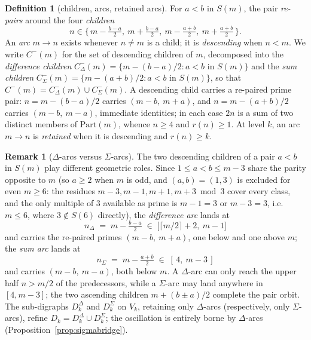 \documentclass[11pt]{article}
\theoremstyle{plain}
\theoremstyle{definition}
\newtheorem{definition}[theorem]{Definition}
\newtheorem{remark}[theorem]{Remark}
\newcommand{\rays}{S}
\newcommand{\rch}{r}
\newcommand{\Vk}{V_{k}}
\newcommand{\Dk}{D_{k}}
\newcommand{\DkD}{D_{k}^{\Delta}}
\newcommand{\DkS}{D_{k}^{\Sigma}}
\begin{document}
\begin{definition}[children, arcs, retained arcs]\label{def:children}
For $a < b$ in $\rays(m)$, the pair \emph{re-pairs} around the four
\emph{children}
\[
n \in \bigl\{\, m - \tfrac{b-a}{2},\ m + \tfrac{b-a}{2},\
                 m - \tfrac{a+b}{2},\ m + \tfrac{a+b}{2}\,\bigr\}.
\]
An \emph{arc} $m \to n$ exists whenever $n \neq m$ is a child; it is
\emph{descending} when $n < m$. We write $C^{-}(m)$ for the set of
descending children of $m$, decomposed into the \emph{difference
children} $C_\Delta^{-}(m) = \{m - (b-a)/2 : a < b \text{ in }
\rays(m)\}$ and the \emph{sum children}
$C_\Sigma^{-}(m) = \{m - (a+b)/2 : a < b \text{ in } \rays(m)\}$, so
that $C^{-}(m) = C_\Delta^{-}(m) \cup C_\Sigma^{-}(m)$. A descending
child carries a re-paired prime pair: $n = m - (b-a)/2$ carries
$(m-b,\ m+a)$, and $n = m - (a+b)/2$ carries $(m-b,\ m-a)$, immediate
identities; in each case $2n$ is a sum of two distinct members of
$\mathrm{Part}(m)$, whence $n \ge 4$ and $\rch(n) \ge 1$. At level
$k$, an arc $m \to n$ is \emph{retained} when it is descending and
$\rch(n) \ge k$.
\end{definition}

\begin{remark}[$\Delta$-arcs versus $\Sigma$-arcs]\label{rem:dsarc}
The two descending children of a pair $a < b$ in $\rays(m)$ play
different geometric roles. Since $1 \le a < b \le m - 3$ share
the parity opposite to $m$ (so $a \ge 2$ when $m$ is odd, and
$(a, b) = (1, 3)$ is excluded for even $m \ge 6$: the residues
$m - 3, m - 1, m + 1, m + 3 \bmod 3$ cover every class, and the
only multiple of $3$ available as prime is $m - 1 = 3$ or
$m - 3 = 3$, i.e.\ $m \le 6$, where $3 \notin \rays(6)$
directly), the
\emph{difference arc} lands at
\[
n_\Delta \;=\; m - \tfrac{b-a}{2} \;\in\;
\bigl[\lceil m/2 \rceil + 2,\ m - 1\bigr]
\]
and carries the re-paired primes $(m - b,\ m + a)$, one below and
one above $m$; the \emph{sum arc} lands at
\[
n_\Sigma \;=\; m - \tfrac{a+b}{2} \;\in\; [\,4,\ m - 3\,]
\]
and carries $(m - b,\ m - a)$, both below $m$. A $\Delta$-arc can
only reach the upper half $n > m/2$ of the predecessors, while a
$\Sigma$-arc may land anywhere in $[4, m-3]$; the two ascending
children $m + (b \pm a)/2$ complete the pair orbit. The
sub-digraphs $\DkD$ and $\DkS$ on $\Vk$, retaining only
$\Delta$-arcs (respectively, only $\Sigma$-arcs), refine
$\Dk = \DkD \cup \DkS$; the oscillation is entirely borne by
$\Delta$-arcs (Proposition~\ref{prop:sigmabridge}).
\end{remark}
\end{document}
